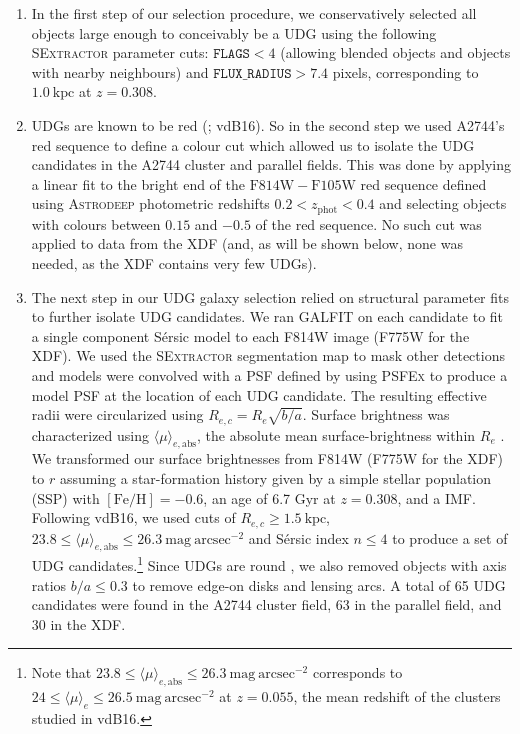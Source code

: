\documentclass[iop,tighten,twocolumn,apj]{emulateapj}
\begin{document}
\begin{enumerate}

\item In the first step of our selection procedure, we conservatively selected
all objects large enough to conceivably be a UDG using the following
\textsc{SExtractor} parameter cuts: $\mathtt{FLAGS} < 4$ (allowing blended
objects and objects with nearby neighbours) and $\mathtt{FLUX\_RADIUS} > 7.4$
pixels, corresponding to $1.0~\mathrm{kpc}$ at $z = 0.308$.

\item UDGs are known to be red (\citealt{vandokkum2015a}; vdB16). So in the
second step we used A2744's red sequence to define a colour cut which allowed
us to isolate the UDG candidates in the A2744 cluster and parallel fields.
This was done by applying a linear fit to the bright end of the
$\mathrm{F814W}-\mathrm{F105W}$ red sequence defined using \textsc{Astrodeep}
\citep{merlin2016,castellano2016} photometric redshifts $0.2 < z_\mathrm{phot}
< 0.4$ and selecting objects with colours between $0.15$ and $-0.5$ of the red
sequence.  No such cut was applied to data from the XDF (and, as will be shown
below, none was needed, as the XDF contains very few UDGs).

\item The next step in our UDG galaxy selection relied on structural parameter
fits to further isolate UDG candidates.  We ran \textsc{GALFIT}
\citep{peng2002} on each candidate to fit a single component S\'ersic model to
each F814W image (F775W for the XDF). We used the \textsc{SExtractor}
segmentation map to mask other detections and models were convolved with a PSF
defined by using \textsc{PSFEx} to produce a model PSF at the location of each
UDG candidate. The resulting effective radii were circularized using $R_{e,c}
= R_e\sqrt{b/a}$. Surface brightness was characterized using
$\langle\mu\rangle_{e,\mathrm{abs}}$, the absolute mean surface-brightness
within $R_e$ \citep{graham2005}. We transformed our surface brightnesses from
F814W (F775W for the XDF) to $r$ assuming a star-formation history given by a
simple stellar population (SSP) with $[\mathrm{Fe}/\mathrm{H}] = -0.6$, an age
of 6.7 Gyr at $z=0.308$, and a \cite{chabrier2003} IMF.  Following vdB16, we
used cuts of $R_{e,c} \geq 1.5~\mathrm{kpc}$, $23.8 \leq
\langle\mu\rangle_{e,\mathrm{abs}} \leq
26.3~\mathrm{mag}~\mathrm{arcsec}^{-2}$ and S\'ersic index $n \leq 4$ to
produce a set of UDG candidates.\footnote{Note that $23.8 \leq
\langle\mu\rangle_{e,\mathrm{abs}} \leq
26.3~\mathrm{mag}~\mathrm{arcsec}^{-2}$ corresponds to $24 \leq
\langle\mu\rangle_e \leq 26.5~\mathrm{mag}~\mathrm{arcsec}^{-2}$ at $z =
0.055$, the mean redshift of the clusters studied in vdB16.} Since UDGs are
round \citep{burkert2016}, we also removed objects with axis ratios $b/a \leq
0.3$ to remove edge-on disks and lensing arcs. A total of 65 UDG candidates
were found in the A2744 cluster field, 63 in the parallel field, and 30 in the
XDF.


\end{enumerate}
\end{document}
